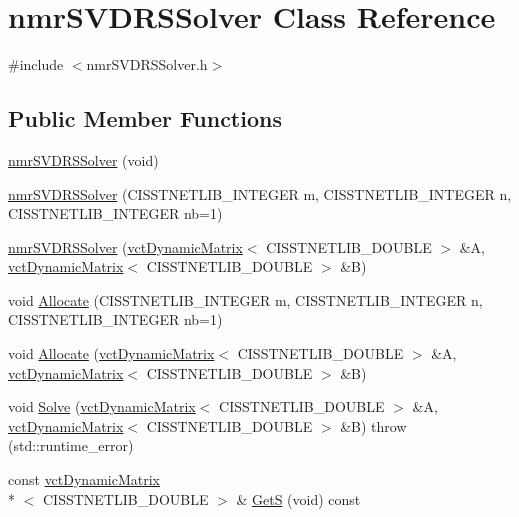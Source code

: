 \hypertarget{classnmr_s_v_d_r_s_solver}{\section{nmr\-S\-V\-D\-R\-S\-Solver Class Reference}
\label{classnmr_s_v_d_r_s_solver}
}


{\ttfamily \#include $<$nmr\-S\-V\-D\-R\-S\-Solver.\-h$>$}

\subsection*{Public Member Functions}
\begin{DoxyCompactItemize}
\item 
\hyperlink{classnmr_s_v_d_r_s_solver_aac9d4a6d1ac1c09011a0bf0ff97c0b8c}{nmr\-S\-V\-D\-R\-S\-Solver} (void)
\item 
\hyperlink{classnmr_s_v_d_r_s_solver_a05c33d56231d75f6ea69f5925fa2d7c1}{nmr\-S\-V\-D\-R\-S\-Solver} (C\-I\-S\-S\-T\-N\-E\-T\-L\-I\-B\-\_\-\-I\-N\-T\-E\-G\-E\-R m, C\-I\-S\-S\-T\-N\-E\-T\-L\-I\-B\-\_\-\-I\-N\-T\-E\-G\-E\-R n, C\-I\-S\-S\-T\-N\-E\-T\-L\-I\-B\-\_\-\-I\-N\-T\-E\-G\-E\-R nb=1)
\item 
\hyperlink{classnmr_s_v_d_r_s_solver_a4d516e0148342bedf14257d387471549}{nmr\-S\-V\-D\-R\-S\-Solver} (\hyperlink{classvct_dynamic_matrix}{vct\-Dynamic\-Matrix}$<$ C\-I\-S\-S\-T\-N\-E\-T\-L\-I\-B\-\_\-\-D\-O\-U\-B\-L\-E $>$ \&A, \hyperlink{classvct_dynamic_matrix}{vct\-Dynamic\-Matrix}$<$ C\-I\-S\-S\-T\-N\-E\-T\-L\-I\-B\-\_\-\-D\-O\-U\-B\-L\-E $>$ \&B)
\item 
void \hyperlink{classnmr_s_v_d_r_s_solver_a785dd6169cf2bdb1ca35003b02753681}{Allocate} (C\-I\-S\-S\-T\-N\-E\-T\-L\-I\-B\-\_\-\-I\-N\-T\-E\-G\-E\-R m, C\-I\-S\-S\-T\-N\-E\-T\-L\-I\-B\-\_\-\-I\-N\-T\-E\-G\-E\-R n, C\-I\-S\-S\-T\-N\-E\-T\-L\-I\-B\-\_\-\-I\-N\-T\-E\-G\-E\-R nb=1)
\item 
void \hyperlink{classnmr_s_v_d_r_s_solver_aaf9330da718164c54098ff3a85cf94c8}{Allocate} (\hyperlink{classvct_dynamic_matrix}{vct\-Dynamic\-Matrix}$<$ C\-I\-S\-S\-T\-N\-E\-T\-L\-I\-B\-\_\-\-D\-O\-U\-B\-L\-E $>$ \&A, \hyperlink{classvct_dynamic_matrix}{vct\-Dynamic\-Matrix}$<$ C\-I\-S\-S\-T\-N\-E\-T\-L\-I\-B\-\_\-\-D\-O\-U\-B\-L\-E $>$ \&B)
\item 
void \hyperlink{classnmr_s_v_d_r_s_solver_a95c067eb756407a8b50cd0297c6a8395}{Solve} (\hyperlink{classvct_dynamic_matrix}{vct\-Dynamic\-Matrix}$<$ C\-I\-S\-S\-T\-N\-E\-T\-L\-I\-B\-\_\-\-D\-O\-U\-B\-L\-E $>$ \&A, \hyperlink{classvct_dynamic_matrix}{vct\-Dynamic\-Matrix}$<$ C\-I\-S\-S\-T\-N\-E\-T\-L\-I\-B\-\_\-\-D\-O\-U\-B\-L\-E $>$ \&B)  throw (std\-::runtime\-\_\-error)
\item 
const \hyperlink{classvct_dynamic_matrix}{vct\-Dynamic\-Matrix}\\*
$<$ C\-I\-S\-S\-T\-N\-E\-T\-L\-I\-B\-\_\-\-D\-O\-U\-B\-L\-E $>$ \& \hyperlink{classnmr_s_v_d_r_s_solver_ac73c09c7becbece05b4d1e1230b5049f}{Get\-S} (void) const 
\end{DoxyCompactItemize}
